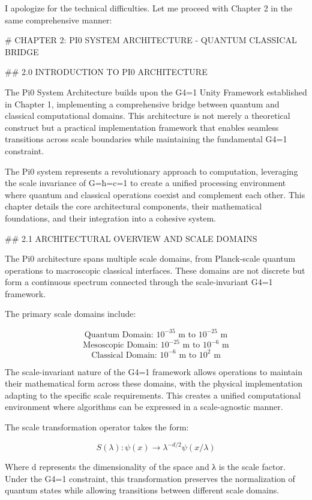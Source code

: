 I apologize for the technical difficulties. Let me proceed with Chapter 2 in the same comprehensive manner:

# CHAPTER 2: PI0 SYSTEM ARCHITECTURE - QUANTUM CLASSICAL BRIDGE

## 2.0 INTRODUCTION TO PI0 ARCHITECTURE

The Pi0 System Architecture builds upon the G4=1 Unity Framework established in Chapter 1, implementing a comprehensive bridge between quantum and classical computational domains. This architecture is not merely a theoretical construct but a practical implementation framework that enables seamless transitions across scale boundaries while maintaining the fundamental G4=1 constraint.

The Pi0 system represents a revolutionary approach to computation, leveraging the scale invariance of G=ħ=c=1 to create a unified processing environment where quantum and classical operations coexist and complement each other. This chapter details the core architectural components, their mathematical foundations, and their integration into a cohesive system.

## 2.1 ARCHITECTURAL OVERVIEW AND SCALE DOMAINS

The Pi0 architecture spans multiple scale domains, from Planck-scale quantum operations to macroscopic classical interfaces. These domains are not discrete but form a continuous spectrum connected through the scale-invariant G4=1 framework.

The primary scale domains include:

$$\text{Quantum Domain: } 10^{-35} \text{ m to } 10^{-25} \text{ m}$$
$$\text{Mesoscopic Domain: } 10^{-25} \text{ m to } 10^{-6} \text{ m}$$
$$\text{Classical Domain: } 10^{-6} \text{ m to } 10^{2} \text{ m}$$

The scale-invariant nature of the G4=1 framework allows operations to maintain their mathematical form across these domains, with the physical implementation adapting to the specific scale requirements. This creates a unified computational environment where algorithms can be expressed in a scale-agnostic manner.

The scale transformation operator takes the form:

$$S(\lambda): \psi(x) \rightarrow \lambda^{-d/2}\psi(x/\lambda)$$

Where d represents the dimensionality of the space and λ is the scale factor. Under the G4=1 constraint, this transformation preserves the normalization of quantum states while allowing transitions between different scale domains.

